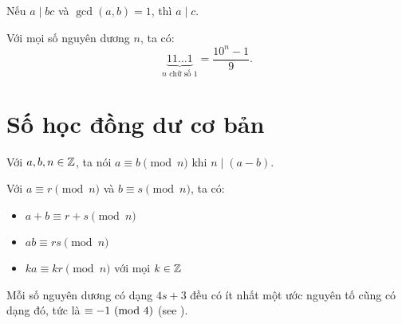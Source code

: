 \documentclass[../imo-training-open-book.tex]{subfiles}
\begin{document}
\begin{theorem*}
    \label{theorem:coprime-divides-product}
	Nếu \( a \mid bc \) và \( \gcd(a, b) = 1 \), thì \( a \mid c \).
\end{theorem*}

\begin{lemma}
    \label{lemma:repunit-form}
    Với mọi số nguyên dương \(n\), ta có:
    \[
        \underbrace{11\dots1}_{n\text{ chữ số }1} = \frac{10^n - 1}{9}.
    \]
\end{lemma}

\newpage

\section{Số học đồng dư cơ bản}

\begin{definition}
    \label{definition:modular-congruence}
    Với \( a, b, n \in \mathbb Z \), ta nói \( a \equiv b \pmod{n} \) khi \( n \mid (a - b) \).
\end{definition}

\vspace{1em}

\begin{theorem}
    \label{theorem:modular-properties}
    Với \( a \equiv r \pmod{n} \) và \( b \equiv s \pmod{n} \), ta có:
    \begin{itemize}[topsep=0pt, itemsep=0pt]
        \item \( a + b \equiv r + s \pmod{n} \)
        \item \( ab \equiv rs \pmod{n} \)
        \item \( ka \equiv kr \pmod{n} \) với mọi \( k \in \mathbb Z \)
    \end{itemize}
\end{theorem}

\vspace{1em}

\begin{theorem}
    \label{theorem:prime-divisor-4k3}
    Mỗi số nguyên dương có dạng \(4s + 3\) đều có ít nhất một ước nguyên tố cũng có dạng đó, tức là \(\equiv -1 \ (\mathrm{mod}\ 4)\)
    (see ).
\end{theorem}

\vspace{1em}
\end{document}
